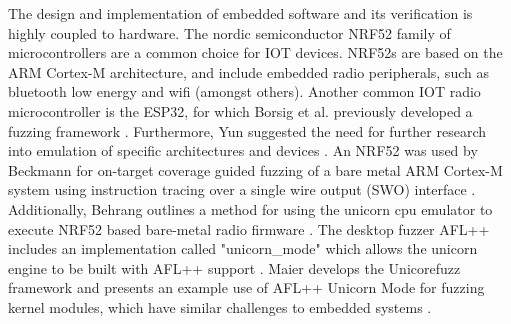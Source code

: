 \documentclass[../report.tex]{subfiles}
\begin{document}
The design and implementation of embedded software and its verification is
highly coupled to hardware. The nordic semiconductor NRF52 family of
microcontrollers are a common choice for IOT devices. NRF52s are based on the
ARM Cortex-M architecture, and include embedded radio peripherals, such as
bluetooth low energy and wifi (amongst others). Another common IOT radio
microcontroller is the ESP32, for which Borsig et al. previously developed a
fuzzing framework \citep{Borsig_2020}. Furthermore, Yun suggested the need for
further research into emulation of specific architectures and devices
\citep{Yun_2022}. An NRF52 was used by Beckmann for on-target coverage guided
fuzzing of a bare metal ARM Cortex-M system using instruction tracing over a
single wire output (SWO) interface \citep{Beckmann_2023}. Additionally, Behrang
outlines a method for using the unicorn cpu emulator to execute NRF52 based
bare-metal radio firmware \citep{Behrang_2023}. The desktop fuzzer AFL++
includes an implementation called "unicorn\_mode" which allows the unicorn
engine to be built with AFL++ support \citep{UnicornMode}. Maier develops the
Unicorefuzz framework and presents an example use of AFL++ Unicorn Mode for
fuzzing kernel modules, which have similar challenges to embedded systems
\citep{Maier_2019}.


\end{document}
